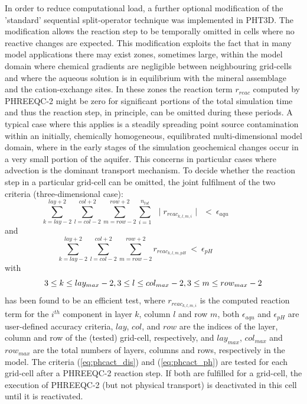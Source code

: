 In order to reduce computational load, a further optional
modification of the 'standard' sequential split-ope\-ra\-tor
tech\-nique was implemented in PHT3D. The modification allows the
reaction step to be temporally omitted in cells where no reactive
changes are expected. This modification exploits the fact that in
many model applications there may exist zones, sometimes large,
within the model domain where chemical gradients are negligible
between neighbouring grid-cells and where the aqueous solution is
in equilibrium with the mineral assemblage and the cation-exchange
sites. In these zones the reaction term $r_{reac}$ computed by
PHREEQC-2 might be zero for significant portions of the total
simulation time and thus the reaction step, in principle, can be
omitted during these periods. A typical case where this applies is
a steadily spreading point source contamination within an
initially, chemically homogeneous, equilibrated multi-dimensional
model domain, where in the early stages of the simulation
geochemical changes occur in a very small portion of the aquifer.
This concerns in particular cases where advection is the dominant
transport mechanism. To decide whether the reaction step in a
particular grid-cell can be omitted, the joint fulfilment of the
two criteria (three-dimensional case):
\begin{equation}
  {\sum_{k = lay-2}^{lay+2}\sum_{l=col-2}^{col+2}\sum_{m=row-2}^{row+2}\sum_{i=1}^{n_{tot}}
\ \ \mid r_{reac_{k,l,m,i}} \mid \ \ < \ \epsilon_{aqu}
\ \ \ \ \ \ \ \ \ \ \ \ \ \ \ \ \ \ \ \ }
\label{eq:phcact_dis}
\end{equation}
and
\begin{equation}
  {{\sum_{k = lay-2}^{lay+2}\sum_{l=col-2}^{col+2}\sum_{m=row-2}^{row+2}
r_{reac_{k,l,m,pH}}} \ < \ \epsilon_{pH} \ \ \ \ \ \ \ \ \ \ \ \ \
\ \ \ \ \ \ \ }
\label{eq:phcact_ph}
\end{equation}
with
\begin{equation*}
  { 3 \leq k \leq lay_{max}-2, \\
    3 \leq l \leq col_{max}-2, \\
    3 \leq m \leq row_{max}-2   }
\end{equation*}
has been found to be an efficient test, where $r_{reac_{k,l,m,i}}$
is the computed reaction term for the $i^{th}$ component in layer
$k$, column $l$ and row $m$, both $\epsilon_{aqu}$ and
$\epsilon_{pH}$ are user-defined accuracy criteria, $lay$, $col$,
and $row$ are the indices of the layer, column and row of the
(tested) grid-cell, respectively, and $lay_{max}$, $col_{max}$ and
$row_{max}$ are the total numbers of layers, columns and rows,
respectively in the model. The criteria (\ref{eq:phcact_dis}) and
(\ref{eq:phcact_ph}) are tested for each grid-cell after a
PHREEQC-2 reaction step. If both are fulfilled for a grid-cell,
the execution of PHREEQC-2 (but not physical transport) is
deactivated in this cell until it is reactivated.

